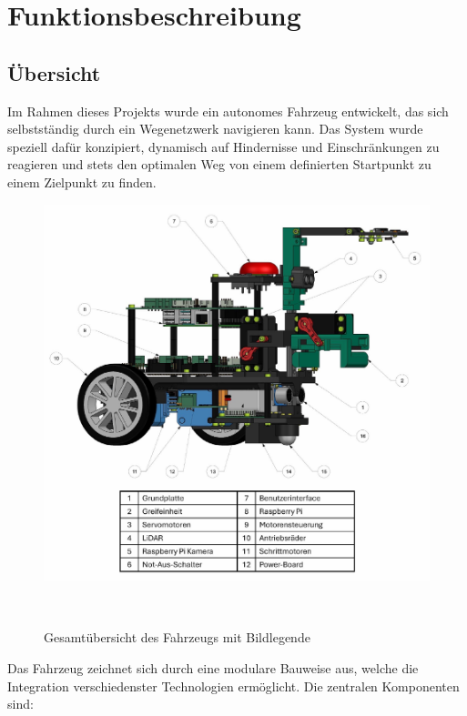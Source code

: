\documentclass[main.tex]{subfiles} %
\begin{document}

\section{Funktionsbeschreibung}

\subsection{Übersicht}

Im Rahmen dieses Projekts wurde ein autonomes Fahrzeug entwickelt, das sich selbstständig 
durch ein Wegenetzwerk navigieren kann. Das System wurde speziell dafür konzipiert, dynamisch 
auf Hindernisse und Einschränkungen zu reagieren und stets den optimalen Weg von einem 
definierten Startpunkt zu einem Zielpunkt zu finden.

\begin{figure}[H]
    \centering
    \includegraphics[width = 1.0\linewidth]{./Figures/Gesamtuebersicht-Fahrzeug.pdf}
    \caption{Gesamtübersicht des Fahrzeugs mit Bildlegende}~\label{fig:Gesamtuebersicht}
\end{figure}

Das Fahrzeug zeichnet sich durch eine modulare Bauweise aus, welche die Integration verschiedenster 
Technologien ermöglicht. Die zentralen Komponenten sind:
\end{document}
